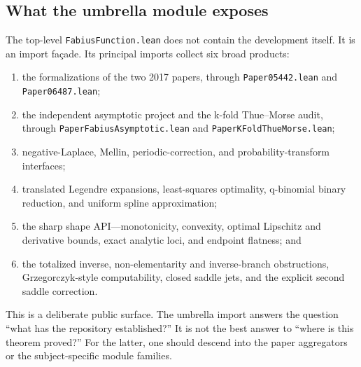 \documentclass[11pt,oneside]{article}
\theoremstyle{definition}
\theoremstyle{remark}
\begin{document}
\subsection{What the umbrella module exposes}
The top-level \nolinkurl{FabiusFunction.lean} does not contain the development itself.  It is an import façade.  Its principal imports collect six broad products:
\begin{enumerate}
  \item the formalizations of the two 2017 papers, through \nolinkurl{Paper05442.lean} and \nolinkurl{Paper06487.lean};
  \item the independent asymptotic project and the k-fold Thue--Morse audit, through \nolinkurl{PaperFabiusAsymptotic.lean} and \nolinkurl{PaperKFoldThueMorse.lean};
  \item negative-Laplace, Mellin, periodic-correction, and probability-transform interfaces;
  \item translated Legendre expansions, least-squares optimality, q-binomial binary reduction, and uniform spline approximation;
  \item the sharp shape API---monotonicity, convexity, optimal Lipschitz and derivative bounds, exact analytic loci, and endpoint flatness; and
  \item the totalized inverse, non-elementarity and inverse-branch obstructions, Grzegorczyk-style computability, closed saddle jets, and the explicit second saddle correction.
\end{enumerate}
This is a deliberate public surface.  The umbrella import answers the question ``what has the repository established?''  It is not the best answer to ``where is this theorem proved?''  For the latter, one should descend into the paper aggregators or the subject-specific module families.
\end{document}
